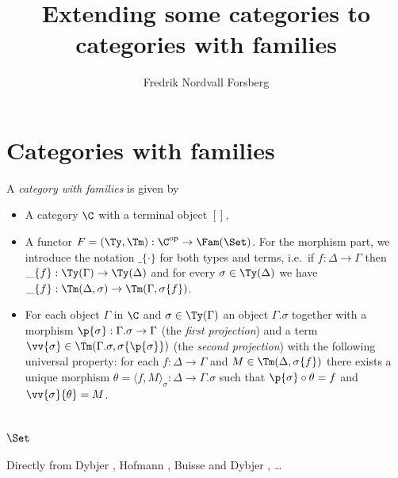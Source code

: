 \documentclass{article}
\title{Extending some categories to categories with families}
\author{Fredrik Nordvall Forsberg}
\begin{document}
\maketitle

\section{Categories with families}

\begin{definition}
  A \emph{category with families} is given by
  \begin{itemize}
  \item A category $\C$ with a terminal object $[]$,
  \item A functor $F = (\Ty, \Tm) : \C^{\text{op}} \to
    \Fam(\Set)$. For the morphism part, we introduce the notation
    $\_\{\cdot\}$ for both types and terms, i.e.\ if $f : \Delta \to
    \Gamma$ then $\_\{f\} : \Ty(\Gamma) \to \Ty(\Delta)$ and for every
    $\sigma \in \Ty(\Delta)$ we have $\_\{f\} : \Tm(\Delta, \sigma)
    \to \Tm(\Gamma, \sigma\{f\})$.
  \item For each object $\Gamma$ in $\C$ and $\sigma \in \Ty(\Gamma)$
    an object $\Gamma.\sigma$ together with a morphism $\p{\sigma} :
    \Gamma.\sigma \to \Gamma$ (the \emph{first projection}) and a term
    $\vv{\sigma} \in \Tm(\Gamma.\sigma, \sigma\{\p{\sigma}\})$ (the
    \emph{second projection}) with the following universal property:
    for each $f : \Delta \to \Gamma$ and $M \in \Tm(\Delta, \sigma\{f\})$
    there exists a unique morphism $\theta = \langle f,
    M\rangle_{\sigma} : \Delta \to \Gamma.\sigma$ such that
    $\p{\sigma} \circ \theta = f$ and
    $\vv{\sigma}\{\theta\} = M$.
  \end{itemize}
\end{definition}

\section{$\Set$}
\label{cwfSet}

Directly from Dybjer \cite{dybjer1996internalTT} , Hofmann
\cite{hofmann1997syntaxsemantics}, Buisse and Dybjer \cite{buisseDybjer2008cwflccc}, \ldots
\end{document}
